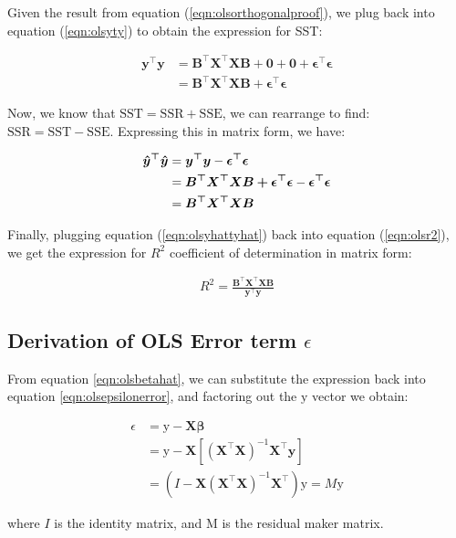 \documentclass{article}
\begin{document}
\noindent Given the result from equation (\ref{eqn:olsorthogonalproof}), we plug back into equation (\ref{eqn:olsyty}) to obtain the expression for SST:

\begin{align}
    \nonumber \bm{y^\top y} &= \bm{B^\top X^\top XB + 0 + 0 + \epsilon^\top \epsilon} \\ 
    &= \bm{B^\top X^\top XB + \epsilon^\top \epsilon}
\end{align}

\noindent Now, we know that $\text{SST} = \text{SSR} + \text{SSE}$, we can rearrange to find: $\text{SSR} = \text{SST} - \text{SSE}$. Expressing this in matrix form, we have:

\begin{align}
    \nonumber \bm{\Hat{y}^\top}\bm{\Hat{y}} &= \bm{y^\top y} - \bm{\epsilon^\top \epsilon} \\ \nonumber
    &= \bm{B^\top X^\top XB + \epsilon^\top \epsilon} - \bm{\epsilon^\top \epsilon} \\ 
    \label{eqn:olsyhattyhat} &= \bm{B^\top X^\top XB}
\end{align}

\noindent Finally, plugging equation (\ref{eqn:olsyhattyhat}) back into equation (\ref{eqn:olsr2}), we get the expression for $R^2$ coefficient of determination in matrix form: 

\begin{align}
    R^2 = \frac{\bm{B^\top X^\top XB}}{\bm{y^\top y}}
\end{align}

\subsection{Derivation of OLS Error term $\epsilon$}
From equation \ref{eqn:olsbetahat}, we can substitute the expression back into equation \ref{eqn:olsepsilonerror}, and factoring out the $\mathrm{y}$ vector we obtain:

\begin{align}
    \nonumber \epsilon &= \mathrm{y} - \bm{X\beta} \\ \nonumber
    &= \mathrm{y} - \bm{X}[(\bm{X^\top X})^{-1} \bm{X^\top} \mathbf{y}] \\
    &= \left (I - \bm{X}(\bm{X^\top X})^{-1} \bm{X^\top} \right ) \mathrm{y} = M \mathrm{y}
\end{align}

\noindent where $I$ is the identity matrix, and M is the residual maker matrix. 
\end{document}
